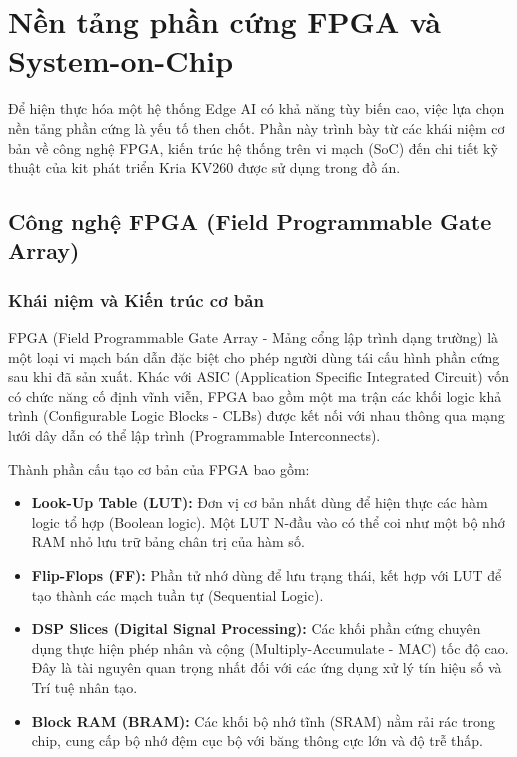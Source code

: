 \section{Nền tảng phần cứng FPGA và System-on-Chip}

Để hiện thực hóa một hệ thống Edge AI có khả năng tùy biến cao, 
việc lựa chọn nền tảng phần cứng là yếu tố then chốt. 
Phần này trình bày từ các khái niệm cơ bản về công nghệ FPGA, 
kiến trúc hệ thống trên vi mạch (SoC) đến chi tiết kỹ thuật của 
kit phát triển Kria KV260 được sử dụng trong đồ án.

\subsection{Công nghệ FPGA (Field Programmable Gate Array)}
\subsubsection{Khái niệm và Kiến trúc cơ bản}
FPGA (Field Programmable Gate Array - Mảng cổng lập trình dạng trường) 
là một loại vi mạch bán dẫn đặc biệt cho phép người dùng tái cấu hình 
phần cứng sau khi đã sản xuất. Khác với ASIC (Application Specific Integrated Circuit) 
vốn có chức năng cố định vĩnh viễn, 
FPGA bao gồm một ma trận các khối logic khả trình (Configurable Logic Blocks - CLBs) 
được kết nối với nhau thông qua mạng lưới dây dẫn có thể lập trình 
(Programmable Interconnects).\cite{fpga1}

Thành phần cấu tạo cơ bản của FPGA bao gồm:
\begin{itemize}
    \item \textbf{Look-Up Table (LUT):} Đơn vị cơ bản nhất dùng để hiện thực các hàm logic tổ hợp (Boolean logic). Một LUT N-đầu vào có thể coi như một bộ nhớ RAM nhỏ lưu trữ bảng chân trị của hàm số.
    \item \textbf{Flip-Flops (FF):} Phần tử nhớ dùng để lưu trạng thái, kết hợp với LUT để tạo thành các mạch tuần tự (Sequential Logic).
    \item \textbf{DSP Slices (Digital Signal Processing):} Các khối phần cứng chuyên dụng thực hiện phép nhân và cộng (Multiply-Accumulate - MAC) tốc độ cao. Đây là tài nguyên quan trọng nhất đối với các ứng dụng xử lý tín hiệu số và Trí tuệ nhân tạo.
    \item \textbf{Block RAM (BRAM):} Các khối bộ nhớ tĩnh (SRAM) nằm rải rác trong chip, cung cấp bộ nhớ đệm cục bộ với băng thông cực lớn và độ trễ thấp.
\end{itemize}

